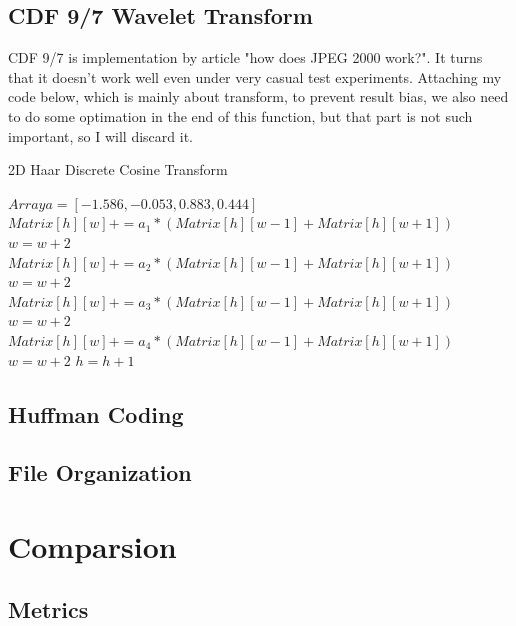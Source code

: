 \documentclass[UTF8, letterpaper, 14pt]{article}
\begin{document}
\subsection{CDF 9/7 Wavelet Transform}
CDF 9/7 is implementation by article "how does JPEG 2000 work?".\cite{jpeg2kwork} It turns that it doesn't work well even under very casual test experiments. Attaching my code below, which is mainly about transform, to prevent result bias, we also need to do some optimation in the end of this function, but that part is not such important, so I will discard it.
\begin{spacing}{0.7}
\begin{algorithm}[htb]
\caption{2D Haar Discrete Cosine Transform}
   \begin{algorithmic}[1]
   	  \State $ Array a = [-1.586, -0.053, 0.883, 0.444]$ 
        			\State $Matrix[h][w] += a_1 * (Matrix[h][w-1] + Matrix[h][w+1])$
        			\State $w = w + 2$
        		\EndFor
        			\State $Matrix[h][w] += a_2 * (Matrix[h][w-1] + Matrix[h][w+1])$
        			\State $w = w + 2$
        		\EndFor
        			\State $Matrix[h][w] += a_3 * (Matrix[h][w-1] + Matrix[h][w+1])$
        			\State $w = w + 2$
        		\EndFor
        			\State $Matrix[h][w] += a_4 * (Matrix[h][w-1] + Matrix[h][w+1])$
        			\State $w = w + 2$
        		\EndFor
        		\State $h = h + 1$
        \EndFor
       \EndFunction    
\end{algorithmic}
\end{algorithm}
\end{spacing}
\subsection{Huffman Coding}
\subsection{File Organization}
\section{Comparsion}
\subsection{Metrics}
\end{document}
